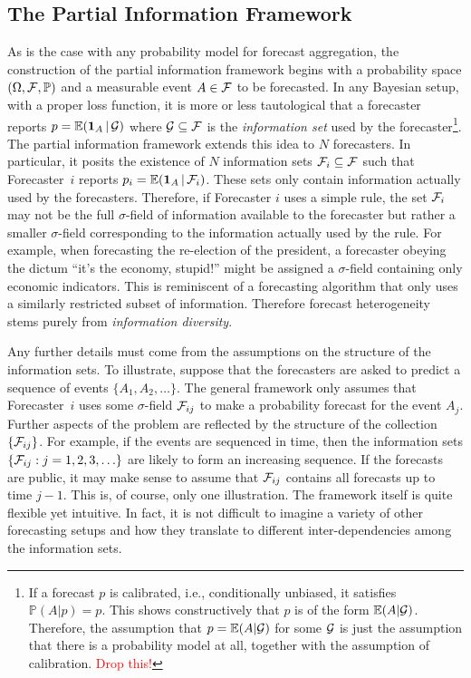 \documentclass[12pt]{article}
\renewcommand{\P}{\mathbb{P}}
\newcommand{\E}{\mathbb{E}}
\theoremstyle{definition}
\theoremstyle{definition}
\def\one{{\bf 1}}
\def\F{{\cal F}}
\def\G{{\cal G}}
\def\P{{\mathbb P}}
\def\E{{\mathbb E}}
\def\|{\, | \,}
\begin{document}
\subsection{The Partial Information Framework}
\label{PIFintro}
As is the case with any probability model for forecast aggregation, the construction  of the partial information framework begins with
 a probability space $(\Omega, \F , \P)$ and a
measurable event $A \in \F$ to be forecasted.  In any Bayesian setup,
with a proper loss function, it is more or less tautological that a
forecaster reports $p = \E (\one_A \| \G)$ where $\G \subseteq \F$ is
the \textit{information set} used by the forecaster\footnote{If a forecast $p$ is calibrated, i.e., conditionally unbiased, it satisfies $\P(A | p) = p$. This shows constructively that $p$ is of the form $\E(A | \G)$. Therefore, the assumption that $p =  \E(A | \G)$ for some $\G$ is just the assumption that there is a probability model at all, together with the assumption of calibration. \textcolor{red}{Drop this!}}.  The
partial information framework extends this idea to $N$
forecasters. In particular, it posits the existence of $N$
information sets $\F_i \subseteq \F$ such that Forecaster~$i$
reports $p_i = \E (\one_A \| \F_i)$. These sets only contain information actually used by the
forecasters. Therefore, if Forecaster $i$ uses a simple rule, the set $\F_i$ may not be the full $\sigma$-field of
information available to the forecaster but rather a smaller
$\sigma$-field corresponding to the information actually used by the
rule.  For example, when forecasting the re-election of the president,  a forecaster obeying the dictum ``it's the economy,
stupid!''  might be assigned a $\sigma$-field containing only economic
indicators.  This is reminiscent of a forecasting algorithm that only uses
a similarly restricted subset of information. Therefore
forecast heterogeneity stems purely from
\textit{information diversity}.  

Any further details must come from the
assumptions on the structure of the information sets. To illustrate, suppose that the forecasters are asked to predict a sequence of events
$\{ A_1, A_2 , \ldots \}$. The general framework only assumes that
Forecaster~$i$ uses some $\sigma$-field $\F_{ij}$ to make a
probability forecast for the event $A_j$.  Further aspects of the problem
are reflected by the structure of the collection $\{ \F_{ij} \}$.  For
example, if the events are sequenced in time, then the information
sets $\{ \F_{ij} : j = 1 , 2, 3, \ldots \}$ are likely to form an
increasing sequence.  If the forecasts are public, it may make sense
to assume that $\F_{ij}$ contains all forecasts up to time $j-1$.
This is, of course, only one illustration. The framework itself is quite flexible
yet intuitive. In fact, it is not difficult to imagine a variety
of other forecasting setups and how they translate to
different inter-dependencies among the information sets.
\end{document}
